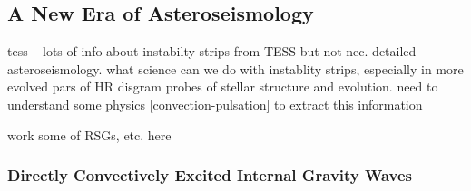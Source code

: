 {\color{blue}
\subsection{A New Era of Asteroseismology}

tess -- lots of info about instabilty strips from TESS but not nec. detailed asteroseismology.  what science can we do with instablity strips, especially in more evolved pars of HR disgram  probes of stellar structure and evolution.   need to understand some physics [convection-pulsation] to extract this information

work some of RSGs, etc. here

\subsubsection{Directly Convectively Excited Internal Gravity Waves}


}
